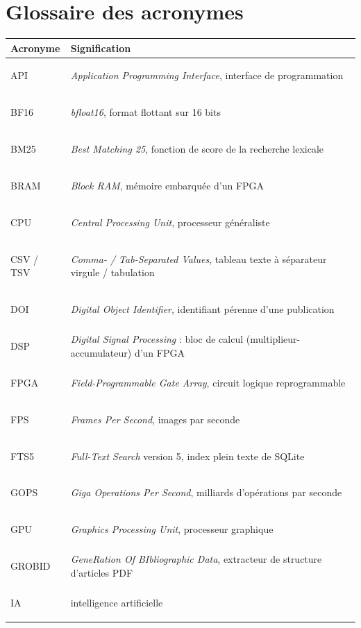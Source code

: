 \documentclass[11pt,a4paper]{article}
\begin{document}



\appendix
\section{Glossaire des acronymes}
\label{sec:acronymes}

\begin{center}
\small
\begin{tabularx}{\linewidth}{@{}lL@{}}
\toprule
Acronyme & Signification \\
\midrule
\hypertarget{gl:API}{API} & \emph{Application Programming Interface}, interface de programmation \\
\hypertarget{gl:BF16}{BF16} & \emph{bfloat16}, format flottant sur 16 bits \\
\hypertarget{gl:BM25}{BM25} & \emph{Best Matching 25}, fonction de score de la recherche lexicale \\
\hypertarget{gl:BRAM}{BRAM} & \emph{Block RAM}, mémoire embarquée d'un FPGA \\
\hypertarget{gl:CPU}{CPU} & \emph{Central Processing Unit}, processeur généraliste \\
\hypertarget{gl:CSV}{CSV / TSV} & \emph{Comma- / Tab-Separated Values}, tableau texte à séparateur virgule / tabulation \\
\hypertarget{gl:DOI}{DOI} & \emph{Digital Object Identifier}, identifiant pérenne d'une publication \\
\hypertarget{gl:DSP}{DSP} & \emph{Digital Signal Processing} : bloc de calcul (multiplieur-accumulateur) d'un FPGA \\
\hypertarget{gl:FPGA}{FPGA} & \emph{Field-Programmable Gate Array}, circuit logique reprogrammable \\
\hypertarget{gl:FPS}{FPS} & \emph{Frames Per Second}, images par seconde \\
\hypertarget{gl:FTS5}{FTS5} & \emph{Full-Text Search} version 5, index plein texte de SQLite \\
\hypertarget{gl:GOPS}{GOPS} & \emph{Giga Operations Per Second}, milliards d'opérations par seconde \\
\hypertarget{gl:GPU}{GPU} & \emph{Graphics Processing Unit}, processeur graphique \\
\hypertarget{gl:GROBID}{GROBID} & \emph{GeneRation Of BIbliographic Data}, extracteur de structure d'articles PDF \\
\hypertarget{gl:AI}{IA} & intelligence artificielle \\

\end{tabularx}
\end{center}
\end{document}
